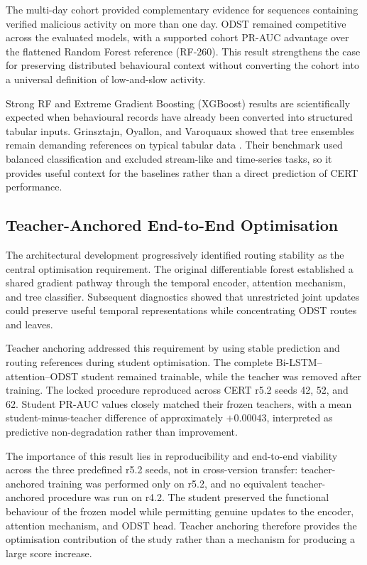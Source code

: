 \smallskip
The multi-day cohort provided complementary evidence for sequences
containing verified malicious activity on more than one day. ODST remained
competitive across the evaluated models, with a supported cohort PR-AUC
advantage over the flattened Random Forest reference (RF-260). This result
strengthens the case for
preserving distributed behavioural context without converting the cohort
into a universal definition of low-and-slow activity.

\smallskip
Strong RF and Extreme Gradient Boosting (XGBoost) results are scientifically
expected when behavioural records have already been converted into
structured tabular inputs. Grinsztajn, Oyallon, and Varoquaux showed that
tree ensembles remain demanding references on typical tabular data
\cite{Grinsztajn2022}. Their benchmark used balanced classification and
excluded stream-like and time-series tasks, so it provides useful context
for the baselines rather than a direct prediction of CERT performance.

\subsection{Teacher-Anchored End-to-End Optimisation}
\label{subsec:discussion_teacher_anchoring}
The architectural development progressively identified routing stability as
the central optimisation requirement. The original differentiable forest
established a shared gradient pathway through the temporal encoder,
attention mechanism, and tree classifier. Subsequent diagnostics showed that
unrestricted joint updates could preserve useful temporal representations
while concentrating ODST routes and leaves.

\smallskip
Teacher anchoring addressed this requirement by using stable prediction and
routing references during student optimisation. The complete
Bi-LSTM--attention--ODST student remained trainable, while the teacher was
removed after training. The locked procedure reproduced across CERT r5.2
seeds 42, 52, and 62. Student PR-AUC values closely matched their frozen
teachers, with a mean student-minus-teacher difference of approximately
\(+0.00043\), interpreted as predictive non-degradation rather than
improvement.

\smallskip
The importance of this result lies in reproducibility and end-to-end
viability across the three predefined r5.2 seeds, not in cross-version
transfer: teacher-anchored training was performed only on r5.2, and no
equivalent teacher-anchored procedure was run on r4.2. The student preserved
the functional behaviour of the frozen model while permitting genuine
updates to the encoder, attention mechanism, and ODST head. Teacher
anchoring therefore provides the optimisation contribution of the study
rather than a mechanism for producing a large score increase.

